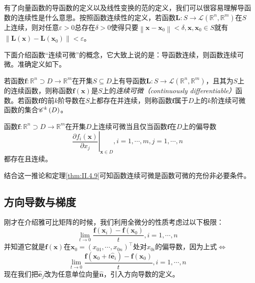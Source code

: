 \documentclass[../main.tex]{subfiles}
\begin{document}
有了向量函数的导函数的定义以及线性变换的范的定义，我们可以很容易理解导函数的连续性是什么意思。按照函数连续性的定义，若函数$\mathbf{L}:S\rightarrow\mathcal{L}\left(\mathbb{R}^n,\mathbb{R}^m\right)$在$S$上连续，则对任意$\varepsilon>0$总存在$\delta>0$使得只要$\left\|\mathbf{x}-\mathbf{x}_0\right\|<\delta,\mathbf{x},\mathbf{x}_0\in S$就有$\left\|\mathbf{L}\left(\mathbf{x}\right)-\mathbf{L}\left(\mathbf{x}_0\right)\right\|<\varepsilon$。

下面介绍函数“连续可微”的概念，它大致上说的是：导函数连续，则函数连续可微。准确定义如下。

\begin{definition}[连续可微函数]\label{def:II.4.17}
    若函数$\mathbf{f}:\mathbb{R}^n\supset D\rightarrow\mathbb{R}^m$在开集$S\subseteq D$上有导函数$\mathbf{L}:S\rightarrow\mathcal{L}\left(\mathbb{R}^n,\mathbb{R}^m\right)$，且其为$S$上的连续函数，则称函数$\mathbf{f}\left(\mathbf{x}\right)$是$S$上的\emph{连续可微（continuously differentiable）}函数。若函数$\mathbf{f}$的前$k$阶导数在$S$上都存在并连续，则称函数$\mathbf{f}$属于$D$上的$k$阶连续可微函数的集合$\mathscr{C}^k\left(D\right)$。
\end{definition}

\begin{corollary}\label{cor:II.4.9.1}
    函数$\mathbf{f}:\mathbb{R}^n\supset D\rightarrow\mathbb{R}^m$在开集$D$上连续可微当且仅当函数$\mathbf{f}$在$D$上的偏导数
    \[
        \left.\frac{\partial f_i\left(\mathbf{x}\right)}{\partial x_j}\right|_{\mathbf{x}\in D},i=1,\cdots,m,j=1,\cdots,n
    \]
    都存在且连续。
\end{corollary}

结合这一推论和定理\ref{thm:II.4.9}可知函数连续可微是函数可微的充份非必要条件。

\subsection{方向导数与梯度}
刚才在介绍雅可比矩阵的时候，我们利用全微分的性质考虑过以下极限：
\[
    \lim_{t\to 0}\frac{\mathbf{f}\left(\mathbf{x}_i\right)-\mathbf{f}\left(\mathbf{x}_0\right)}{t},i=1,\cdots,n\]
并知道它就是$\mathbf{f}\left(\mathbf{x}\right)$在$\mathbf{x}_0=\left(x_{01},\cdots,x_{0n}\right)^\intercal$处对$x_{0i}$的偏导数，因为上式$\Leftrightarrow$
\[
    \lim_{t\rightarrow 0}\frac{\mathbf{f}\left(\mathbf{x}_0+t\mathbf{\hat{e}}_i\right)-\mathbf{f}\left(\mathbf{x}_0\right)}{t},i=1,\cdots,n
\]
现在我们把$\mathbf{\hat{e}}_j$改为任意单位向量$\mathbf{\hat{n}}$，引入方向导数的定义。
\end{document}
